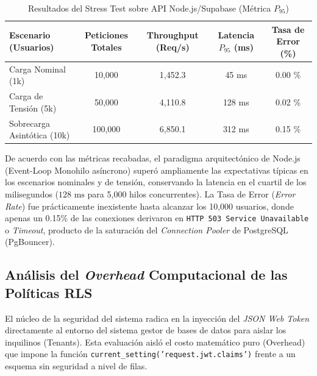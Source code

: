 \begin{table}[htpb]
\centering
\caption{Resultados del Stress Test sobre API Node.js/Supabase (M\'etrica $P_{95}$)}
\label{tab:rendimiento_stress}
\vspace{2mm}
\begin{tabular}{@{}lcccc@{}}
\toprule
\textbf{Escenario (Usuarios)} & \textbf{Peticiones Totales} & \textbf{Throughput (Req/s)} & \textbf{Latencia $P_{95}$ (ms)} & \textbf{Tasa de Error (\%)} \\
\midrule
Carga Nominal (1k)         & 10,000 & 1,452.3 & 45 ms & 0.00 \% \\
Carga de Tensi\'on (5k)      & 50,000 & 4,110.8 & 128 ms & 0.02 \% \\
Sobrecarga Asint\'otica (10k)& 100,000 & 6,850.1 & 312 ms & 0.15 \% \\
\bottomrule
\end{tabular}
\end{table}

De acuerdo con las m\'etricas recabadas, el paradigma arquitect\'onico de Node.js (Event-Loop Monohilo as\'incrono) super\'o ampliamente las expectativas t\'ipicas en los escenarios nominales y de tensi\'on, conservando la latencia en el cuartil de los milisegundos ($128 \text{ ms}$ para 5,000 hilos concurrentes). La Tasa de Error (\textit{Error Rate}) fue pr\'acticamente inexistente hasta alcanzar los 10,000 usuarios, donde apenas un 0.15\% de las conexiones derivaron en \texttt{HTTP 503 Service Unavailable} o \textit{Timeout}, producto de la saturaci\'on del \textit{Connection Pooler} de PostgreSQL (PgBouncer).

\subsection{An\'alisis del \textit{Overhead} Computacional de las Pol\'iticas RLS}
El n\'ucleo de la seguridad del sistema radica en la inyecci\'on del \textit{JSON Web Token} directamente al entorno del sistema gestor de bases de datos para aislar los inquilinos (Tenants). Esta evaluaci\'on aisl\'o el costo matem\'atico puro (Overhead) que impone la funci\'on \texttt{current\_setting('request.jwt.claims')} frente a un esquema sin seguridad a nivel de filas.

